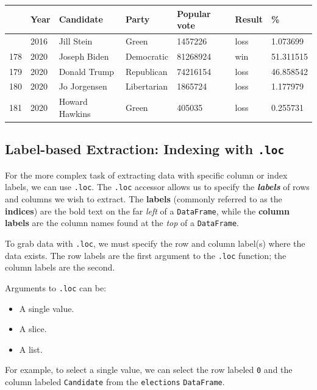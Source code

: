 \documentclass[
  letterpaper,
  DIV=11,
  numbers=noendperiod]{scrreprt}
\providecommand{\tightlist}{%
  \setlength{\itemsep}{0pt}\setlength{\parskip}{0pt}}\usepackage{longtable,booktabs,array}
\begin{document}
\begin{longtable}[]{@{}lllllll@{}}
\toprule\noalign{}
& Year & Candidate & Party & Popular vote & Result & \% \\
\midrule\noalign{}
\endhead
\bottomrule\noalign{}
\endlastfoot
177 & 2016 & Jill Stein & Green & 1457226 & loss & 1.073699 \\
178 & 2020 & Joseph Biden & Democratic & 81268924 & win & 51.311515 \\
179 & 2020 & Donald Trump & Republican & 74216154 & loss & 46.858542 \\
180 & 2020 & Jo Jorgensen & Libertarian & 1865724 & loss & 1.177979 \\
181 & 2020 & Howard Hawkins & Green & 405035 & loss & 0.255731 \\
\end{longtable}

\subsection{\texorpdfstring{Label-based Extraction: Indexing with
\texttt{.loc}}{Label-based Extraction: Indexing with .loc}}\label{label-based-extraction-indexing-with-.loc}

For the more complex task of extracting data with specific column or
index labels, we can use \texttt{.loc}. The \texttt{.loc} accessor
allows us to specify the \textbf{\emph{labels}} of rows and columns we
wish to extract. The \textbf{labels} (commonly referred to as the
\textbf{indices}) are the bold text on the far \emph{left} of a
\texttt{DataFrame}, while the \textbf{column labels} are the column
names found at the \emph{top} of a \texttt{DataFrame}.

To grab data with \texttt{.loc}, we must specify the row and column
label(s) where the data exists. The row labels are the first argument to
the \texttt{.loc} function; the column labels are the second.

Arguments to \texttt{.loc} can be:

\begin{itemize}
\tightlist
\item
  A single value.
\item
  A slice.
\item
  A list.
\end{itemize}

For example, to select a single value, we can select the row labeled
\texttt{0} and the column labeled \texttt{Candidate} from the
\texttt{elections} \texttt{DataFrame}.
\end{document}
